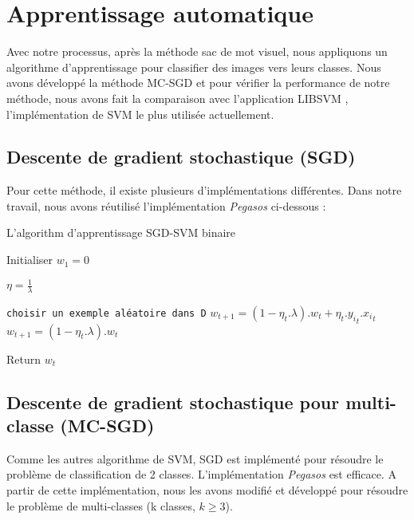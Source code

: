 \section{Apprentissage automatique}
Avec notre processus, après la méthode sac de mot visuel, nous appliquons un algorithme d'apprentissage pour classifier des images vers leurs classes. Nous avons développé la méthode MC-SGD et pour vérifier la performance de notre méthode, nous avons fait la comparaison avec l'application LIBSVM \cite{cl01}, l'implémentation de SVM le plus utilisée actuellement.

\subsection{Descente de gradient stochastique (SGD)}
Pour cette méthode, il existe plusieurs d'implémentations différentes. Dans notre travail, nous avons réutilisé l'implémentation \textit{Pegasos} \cite{sss07} ci-dessous :

\begin{algorithm}[H]
\caption{L'algorithm d'apprentissage SGD-SVM binaire}\label{sgdal}
\begin{algorithmic}[1]

\State Initialiser $w_1 = 0$


\State $\eta = \frac{1}{\lambda}$

\State \texttt{choisir un exemple aléatoire dans D}
\State $w_{t+1} = (1 - \eta_t.\lambda).w_t + \eta_t.{y_i}_t.{x_i}_t$
\Else
\State $w_{t+1} = (1 - \eta_t.\lambda).w_t$
\EndIf
\EndFor

\EndFor

\State Return $w_{t}$

\EndProcedure
\end{algorithmic}
\end{algorithm}



\subsection{Descente de gradient stochastique pour multi-classe (MC-SGD)}
Comme les autres algorithme de SVM, SGD est implémenté pour résoudre le problème de classification de 2 classes. L'implémentation \textit{Pegasos} \cite{sss07} est efficace. A partir de cette implémentation, nous les avons modifié et développé pour résoudre le problème de multi-classes (k classes, $k \geq 3$). \\

